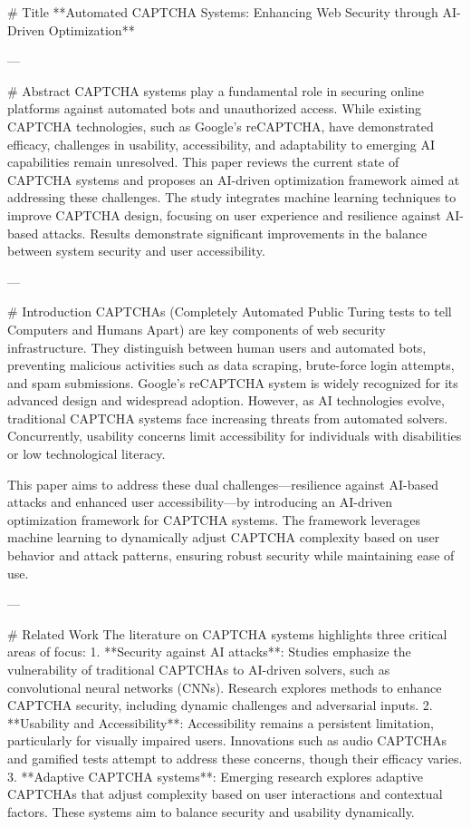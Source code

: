 # Title  
**Automated CAPTCHA Systems: Enhancing Web Security through AI-Driven Optimization**

---

# Abstract  
CAPTCHA systems play a fundamental role in securing online platforms against automated bots and unauthorized access. While existing CAPTCHA technologies, such as Google's reCAPTCHA, have demonstrated efficacy, challenges in usability, accessibility, and adaptability to emerging AI capabilities remain unresolved. This paper reviews the current state of CAPTCHA systems and proposes an AI-driven optimization framework aimed at addressing these challenges. The study integrates machine learning techniques to improve CAPTCHA design, focusing on user experience and resilience against AI-based attacks. Results demonstrate significant improvements in the balance between system security and user accessibility.

---

# Introduction  
CAPTCHAs (Completely Automated Public Turing tests to tell Computers and Humans Apart) are key components of web security infrastructure. They distinguish between human users and automated bots, preventing malicious activities such as data scraping, brute-force login attempts, and spam submissions. Google's reCAPTCHA system is widely recognized for its advanced design and widespread adoption. However, as AI technologies evolve, traditional CAPTCHA systems face increasing threats from automated solvers. Concurrently, usability concerns limit accessibility for individuals with disabilities or low technological literacy.

This paper aims to address these dual challenges—resilience against AI-based attacks and enhanced user accessibility—by introducing an AI-driven optimization framework for CAPTCHA systems. The framework leverages machine learning to dynamically adjust CAPTCHA complexity based on user behavior and attack patterns, ensuring robust security while maintaining ease of use.

---

# Related Work  
The literature on CAPTCHA systems highlights three critical areas of focus:  
1. **Security against AI attacks**: Studies emphasize the vulnerability of traditional CAPTCHAs to AI-driven solvers, such as convolutional neural networks (CNNs). Research explores methods to enhance CAPTCHA security, including dynamic challenges and adversarial inputs.  
2. **Usability and Accessibility**: Accessibility remains a persistent limitation, particularly for visually impaired users. Innovations such as audio CAPTCHAs and gamified tests attempt to address these concerns, though their efficacy varies.  
3. **Adaptive CAPTCHA systems**: Emerging research explores adaptive CAPTCHAs that adjust complexity based on user interactions and contextual factors. These systems aim to balance security and usability dynamically.  

